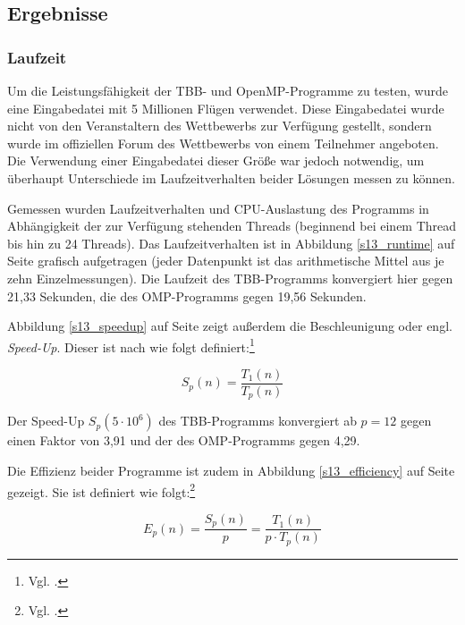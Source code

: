 \documentclass[11pt]{scrartcl}
\begin{document}
\subsection{Ergebnisse}

\subsubsection{Laufzeit}

Um die Leistungsfähigkeit der TBB- und OpenMP-Programme zu testen, wurde eine Eingabedatei mit 5 Millionen Flügen verwendet. Diese Eingabedatei wurde nicht von den Veranstaltern des Wettbewerbs zur Verfügung gestellt, sondern wurde im offiziellen Forum des Wettbewerbs von einem Teilnehmer angeboten. Die Verwendung einer Eingabedatei dieser Größe war jedoch notwendig, um überhaupt Unterschiede im Laufzeitverhalten beider Lösungen messen zu können.

Gemessen wurden Laufzeitverhalten und CPU-Auslastung des Programms in Abhängigkeit der zur Verfügung stehenden Threads (beginnend bei einem Thread bis hin zu 24 Threads). Das Laufzeitverhalten ist in Abbildung \ref{s13_runtime} auf Seite \pageref{s13_runtime} grafisch aufgetragen (jeder Datenpunkt ist das arithmetische Mittel aus je zehn Einzelmessungen). Die Laufzeit des TBB-Programms konvergiert hier gegen 21,33 Sekunden, die des OMP-Programms gegen 19,56 Sekunden.

Abbildung \ref{s13_speedup} auf Seite \pageref{s13_speedup} zeigt außerdem die Beschleunigung oder engl. \emph{Speed-Up}. Dieser ist nach  wie folgt definiert:\footnote{Vgl. \cite[S.~162]{rauber_parallel_2010}.}

\begin{equation}
S_p(n) = \frac{T_1(n)}{T_p(n)}
\end{equation}

Der Speed-Up $S_p(5\cdot 10^6)$ des TBB-Programms konvergiert ab $p=12$ gegen einen Faktor von 3,91 und der des OMP-Programms gegen 4,29.

Die Effizienz beider Programme ist zudem in Abbildung \ref{s13_efficiency} auf Seite \pageref{s13_efficiency} gezeigt. Sie ist definiert wie folgt:\footnote{Vgl. \cite[S.~164]{rauber_parallel_2010}.}

\begin{equation}
E_p(n) = \frac{S_p(n)}{p} = \frac{T_1(n)}{p \cdot T_p(n)}
\end{equation}
\end{document}

